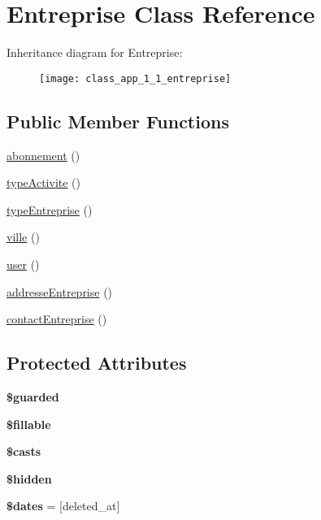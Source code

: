 \hypertarget{class_app_1_1_entreprise}{}\section{Entreprise Class Reference}
\label{class_app_1_1_entreprise}
Inheritance diagram for Entreprise\+:\begin{figure}[H]
\begin{center}
\leavevmode
\texttt{[image: class\_app\_1\_1\_entreprise]}
\end{center}
\end{figure}
\subsection*{Public Member Functions}
\begin{DoxyCompactItemize}
\item 
\mbox{\hyperlink{class_app_1_1_entreprise_a51e8aeb6e46daf02623132bfa73a319d}{abonnement}} ()
\item 
\mbox{\hyperlink{class_app_1_1_entreprise_afaa2ff98624087825021285dba843eda}{type\+Activite}} ()
\item 
\mbox{\hyperlink{class_app_1_1_entreprise_af0a763894489b33621f83aab2e8b5f6c}{type\+Entreprise}} ()
\item 
\mbox{\hyperlink{class_app_1_1_entreprise_ab50fb92a0dde0d4b51fd93f5f40ca293}{ville}} ()
\item 
\mbox{\hyperlink{class_app_1_1_entreprise_ae8a275690ff1b618e1947378b0ed73ae}{user}} ()
\item 
\mbox{\hyperlink{class_app_1_1_entreprise_a74486920b868f8d3ccb631bbc05fee7c}{addresse\+Entreprise}} ()
\item 
\mbox{\hyperlink{class_app_1_1_entreprise_a90b1d0b2ddd2557bcdd3125549acb099}{contact\+Entreprise}} ()
\end{DoxyCompactItemize}
\subsection*{Protected Attributes}
\begin{DoxyCompactItemize}
\item 
{\bfseries \$guarded}
\item 
{\bfseries \$fillable}
\item 
{\bfseries \$casts}
\item 
{\bfseries \$hidden}
\item 
\mbox{\label{class_app_1_1_entreprise_aab581066837d6296ba35c72937b6fc1c}} 
{\bfseries \$dates} = \mbox{[}\textquotesingle{}deleted\+\_\+at\textquotesingle{}\mbox{]}
\end{DoxyCompactItemize}


